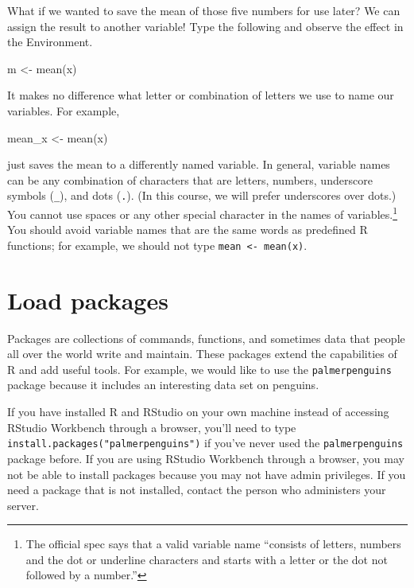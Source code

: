 \documentclass[
]{book}
\newenvironment{Shaded}{\begin{snugshade}}{\end{snugshade}}
\newcommand{\FunctionTok}[1]{\textcolor[rgb]{0.00,0.00,0.00}{#1}}
\newcommand{\NormalTok}[1]{#1}
\newcommand{\OtherTok}[1]{\textcolor[rgb]{0.56,0.35,0.01}{#1}}
\begin{document}
What if we wanted to save the mean of those five numbers for use later? We can assign the result to another variable! Type the following and observe the effect in the Environment.

\begin{Shaded}
\begin{Highlighting}[]
\NormalTok{m }\OtherTok{\textless{}{-}} \FunctionTok{mean}\NormalTok{(x)}
\end{Highlighting}
\end{Shaded}

It makes no difference what letter or combination of letters we use to name our variables. For example,

\begin{Shaded}
\begin{Highlighting}[]
\NormalTok{mean\_x }\OtherTok{\textless{}{-}} \FunctionTok{mean}\NormalTok{(x)}
\end{Highlighting}
\end{Shaded}

just saves the mean to a differently named variable. In general, variable names can be any combination of characters that are letters, numbers, underscore symbols (\texttt{\_}), and dots (\texttt{.}). (In this course, we will prefer underscores over dots.) You cannot use spaces or any other special character in the names of variables.\footnote{The official spec says that a valid variable name ``consists of letters, numbers and the dot or underline characters and starts with a letter or the dot not followed by a number.''} You should avoid variable names that are the same words as predefined R functions; for example, we should not type \texttt{mean\ \textless{}-\ mean(x)}.

\hypertarget{intror-loadpackages}{%
\section{Load packages}\label{intror-loadpackages}}

Packages are collections of commands, functions, and sometimes data that people all over the world write and maintain. These packages extend the capabilities of R and add useful tools. For example, we would like to use the \texttt{palmerpenguins} package because it includes an interesting data set on penguins.

If you have installed R and RStudio on your own machine instead of accessing RStudio Workbench through a browser, you'll need to type \texttt{install.packages("palmerpenguins")} if you've never used the \texttt{palmerpenguins} package before. If you are using RStudio Workbench through a browser, you may not be able to install packages because you may not have admin privileges. If you need a package that is not installed, contact the person who administers your server.
\end{document}
